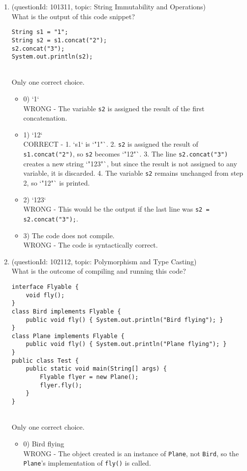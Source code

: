 \documentclass[12pt]{article}
\begin{document}
\begin{enumerate}[label=(\arabic*)]
\begin{itemize}
\end{itemize}
\item (questionId: 101311, topic: String Immutability and Operations) \\ 
What is the output of this code snippet?
\begin{verbatim}
String s1 = "1";
String s2 = s1.concat("2");
s2.concat("3");
System.out.println(s2);
\end{verbatim}
\\ \noindent Only one correct choice. 
\begin{itemize}
\item 0) `1`
 \\ 
WRONG - The variable \verb|s2| is assigned the result of the first concatenation.

\item 1) `12`
 \\ 
CORRECT - 1. `s1` is `"1"`. 2. \verb|s2| is assigned the result of \verb|s1.concat("2")|, so \verb|s2| becomes `"12"`. 3. The line \verb|s2.concat("3")| creates a new string `"123"`, but since the result is not assigned to any variable, it is discarded. 4. The variable \verb|s2| remains unchanged from step 2, so `"12"` is printed.

\item 2) `123`
 \\ 
WRONG - This would be the output if the last line was \verb|s2 = s2.concat("3");|.

\item 3) The code does not compile.
 \\ 
WRONG - The code is syntactically correct.

\end{itemize}
\item (questionId: 102112, topic: Polymorphism and Type Casting) \\ 
What is the outcome of compiling and running this code?\n\begin{verbatim}
interface Flyable {
    void fly();
}
class Bird implements Flyable {
    public void fly() { System.out.println("Bird flying"); }
}
class Plane implements Flyable {
    public void fly() { System.out.println("Plane flying"); }
}
public class Test {
    public static void main(String[] args) {
        Flyable flyer = new Plane();
        flyer.fly();
    }
}
\end{verbatim}
\\ \noindent Only one correct choice. 
\begin{itemize}
\item 0) Bird flying
 \\ 
WRONG - The object created is an instance of \verb|Plane|, not \verb|Bird|, so the \verb|Plane|'s implementation of \verb|fly()| is called.


\end{itemize}
\end{enumerate}
\end{document}
